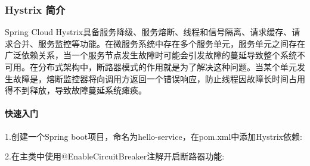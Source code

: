 \documentclass[letterpaper,10pt,english]{sphinxmanual}
\begin{document}
\subsubsection{Hystrix 简介}
\label{\detokenize{01.spring-cloud/03.feign/hystrix_02:hystrix}}\label{\detokenize{01.spring-cloud/03.feign/hystrix_02::doc}}
Spring Cloud Hystrix具备服务降级、服务熔断、线程和信号隔离、请求缓存、请求合并、服务监控等功能。在微服务系统中存在多个服务单元，服务单元之间存在广泛依赖关系，当一个服务节点发生故障时可能会引发故障的蔓延导致整个系统不可用。在分布式架构中，断路器模式的作用就是为了解决这种问题。当某个单元发生故障是，熔断监控器将向调用方返回一个错误响应，防止线程因故障长时间占用得不到释放，导致故障蔓延系统瘫痪。


\paragraph{快速入门}
\label{\detokenize{01.spring-cloud/03.feign/hystrix_02:id1}}
1.创建一个Spring boot项目，命名为hello-service，在pom.xml中添加Hystrix依赖:

\begin{sphinxVerbatim}[commandchars=\\\{\}]
\end{sphinxVerbatim}

2.在主类中使用@EnableCircuitBreaker注解开启断路器功能:

\begin{sphinxVerbatim}[commandchars=\\\{\}]
  

     

          


       \PYG{p}{[}\PYG{p}{]} 

         

\end{sphinxVerbatim}
\end{document}
